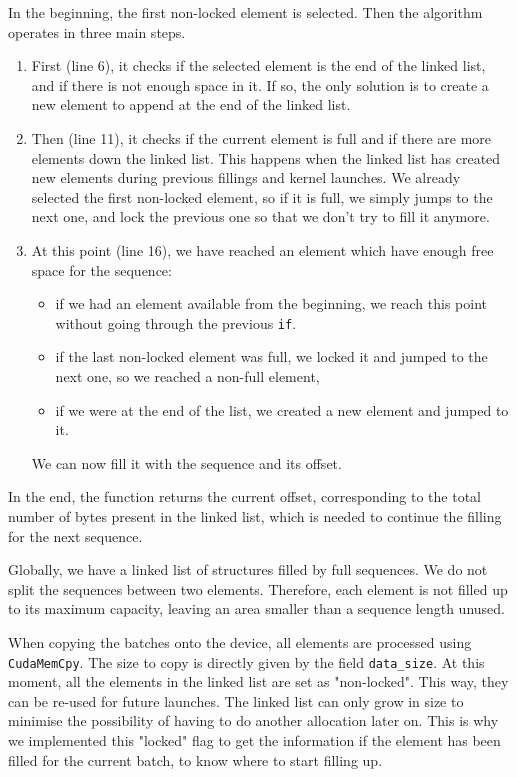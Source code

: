 In the beginning, the first non-locked element is selected. Then the algorithm operates in three main steps. 

\begin{enumerate}
	\item First (line 6), it checks if the selected element is the end of the linked list, and if there is not enough space in it. If so, the only solution is to create a new element to append at the end of the linked list.
	\item Then (line 11), it checks if the current element is full and if there are more elements down the linked list. This happens when the linked list has created new elements during previous fillings and kernel launches. We already selected the first non-locked element, so if it is full, we simply jumps to the next one, and lock the previous one so that we don't try to fill it anymore.
	\item At this point (line 16), we have reached an element which have enough free space for the sequence:
	\begin{itemize}
	    \item if we had an element available from the beginning, we reach this point without going through the previous \verb|if|.
	    \item if the last non-locked element was full, we locked it and jumped to the next one, so we reached a non-full element,
	    \item if we were at the end of the list, we created a new element and jumped to it.
    \end{itemize}
    We can now fill it with the sequence and its offset.
\end{enumerate}

In the end, the function returns the current offset, corresponding to the total number of bytes present in the linked list, which is needed to continue the filling for the next sequence.

Globally, we have a linked list of structures filled by full sequences. We do not split the sequences between two elements. Therefore, each element is not filled up to its maximum capacity, leaving an area smaller than a sequence length unused.

When copying the batches onto the device, all elements are processed using \verb|CudaMemCpy|. The size to copy is directly given by the field \verb|data_size|. At this moment, all the elements in the linked list are set as "non-locked". This way, they can be re-used for future launches. The linked list can only grow in size to minimise the possibility of having to do another allocation later on. This is why we implemented this "locked" flag to get the information if the element has been filled for the current batch, to know where to start filling up.

